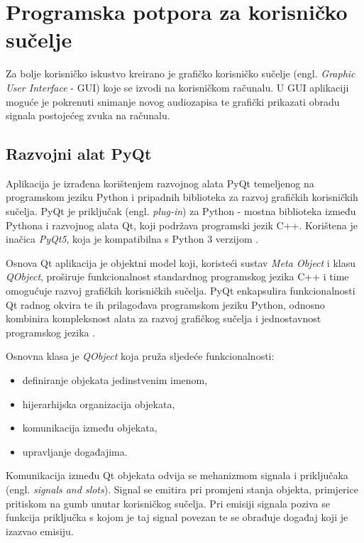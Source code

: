 \chapter{Programska potpora za korisničko sučelje}

Za bolje korisničko iskustvo kreirano je grafičko korisničko sučelje (engl. \textit{Graphic User Interface} - GUI) koje se izvodi na korisničkom računalu. U GUI aplikaciji moguće je pokrenuti snimanje novog audiozapisa te grafički prikazati obradu signala postojećeg zvuka na računalu. 

\section{Razvojni alat PyQt} 
Aplikacija je izrađena korištenjem razvojnog alata PyQt temeljenog na programskom
jeziku Python i pripadnih biblioteka za razvoj grafičkih korisničkih sučelja. PyQt je priključak (engl. \textit{plug-in}) za Python - mostna biblioteka između Pythona i razvojnog alata Qt, koji podržava programski jezik C++. Korištena je inačica \textit{PyQt5}, koja je kompatibilna s Python 3 verzijom \cite{pyqt}. 

Osnova Qt aplikacija je objektni model koji, koristeći sustav \textit{Meta Object} i klasu \textit{QObject}, proširuje funkcionalnost standardnog programskog jezika C++ i time omogućuje razvoj grafičkih korisničkih sučelja. PyQt enkapsulira funkcionalnosti Qt radnog okvira te ih prilagođava programskom jeziku Python, odnosno kombinira kompleksnost alata za razvoj grafičkog sučelja i jednostavnost programskog jezika \cite{qt}. 

Osnovna klasa je \textit{QObject} koja pruža sljedeće funkcionalnosti:
\begin{itemize}
	\item definiranje objekata jedinstvenim imenom,
	\item hijerarhijska organizacija objekata,
	\item komunikacija između objekata, 
	\item upravljanje događajima.
\end{itemize}

Komunikacija između Qt objekata odvija se mehanizmom signala i priključaka (engl. \textit{signals and slots}). Signal se emitira pri promjeni stanja objekta, primjerice pritiskom na gumb unutar korisničkog sučelja. Pri emisiji signala poziva se funkcija priključka s kojom je taj signal povezan te se obrađuje događaj koji je izazvao emisiju. 

